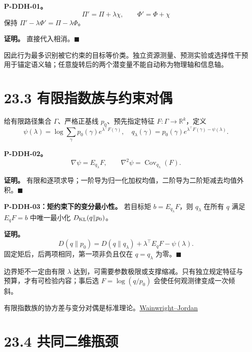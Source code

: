 \documentclass[
  11pt,
  oneside]{book}
\begin{document}
\hypertarget{p-ddh-01}{}\label{p-ddh-01}

\textbf{P-DDH-01。} \[\Pi'=\Pi+\lambda\chi,\qquad
\Phi'=\Phi+\chi\] 保持 \(\Pi'-\lambda\Phi'=\Pi-\lambda\Phi\)。

\textbf{证明。} 直接代入相消。\(\blacksquare\)

因此行为最多识别被它约束的目标等价类。独立资源测量、预测实验或选择性干预用于锚定语义轴；任意旋转后的两个潜变量不能自动称为物理轴和信息轴。

\section{23.3 有限指数族与约束对偶}\label{ux6709ux9650ux6307ux6570ux65cfux4e0eux7ea6ux675fux5bf9ux5076}

给有限路径集合 \(\Gamma\)、严格正基线 \(p_0\)、预先指定特征 \(F:\Gamma\to\mathbb R^k\)，定义 \[\psi(\lambda)=\log\sum_\gamma p_0(\gamma)e^{\lambda^\top F(\gamma)},
\quad
q_\lambda(\gamma)=p_0(\gamma)e^{\lambda^\top F(\gamma)-\psi(\lambda)}.\]

\hypertarget{p-ddh-02}{}\label{p-ddh-02}

\textbf{P-DDH-02。} \[\nabla\psi=E_{q_\lambda}F,\qquad
\nabla^2\psi=\operatorname{Cov}_{q_\lambda}(F).\]

\textbf{证明。} 有限和逐项求导；一阶导为归一化加权均值，二阶导为二阶矩减去均值外积。\(\blacksquare\)

\hypertarget{p-ddh-03}{}\label{p-ddh-03}

\textbf{P-DDH-03：矩约束下的变分最小性。} 若目标矩 \(b=E_{q_\lambda}F\)，则 \(q_\lambda\) 在所有 \(q\) 满足 \(E_qF=b\) 中唯一最小化 \(D_{\rm KL}(q\|p_0)\)。

\textbf{证明。} \[D(q\|p_0)=D(q\|q_\lambda)+\lambda^\top E_qF-\psi(\lambda).\] 固定矩后，后两项相同，第一项非负且仅在 \(q=q_\lambda\) 为零。\(\blacksquare\)

边界矩不一定由有限 \(\lambda\) 达到，可需要参数极限或支撑缩减。只有独立规定特征与预算，才有可检验内容；事后选 \(F=\log(q/p_0)\) 会使任何观测律变成一次倾斜。

有限指数族的协方差与变分对偶是标准理论。\href{https://www.emerald.com/ftmal/article/1/1-2/1/1332382/Graphical-Models-Exponential-Families-and}{Wainwright--Jordan}

\section{23.4 共同二维瓶颈}\label{ux5171ux540cux4e8cux7ef4ux74f6ux9888}
\end{document}
